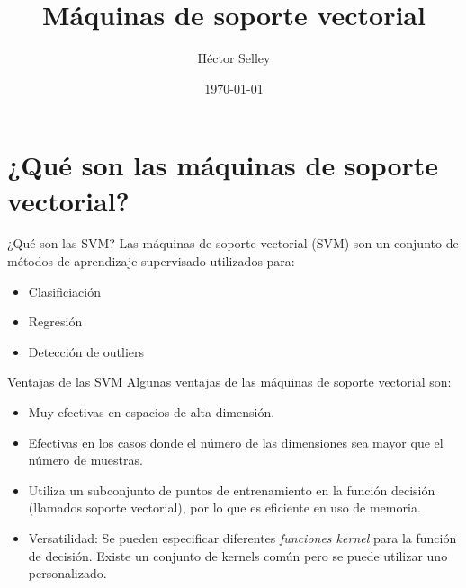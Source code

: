 \documentclass[11pt,aspectratio=169]{beamer}
\author{Héctor Selley}
\title{Máquinas de soporte vectorial}
\institute{Universidad Anáhuac México}
\date{\today}
\begin{document}

\begin{frame}
	\titlepage
\end{frame}


\section{¿Qué son las máquinas de soporte vectorial?}
\begin{frame}{¿Qué son las SVM?}
  Las máquinas de soporte vectorial (SVM) son un conjunto de métodos de aprendizaje supervisado utilizados para: \pause
	\begin{itemize}\pause
		\item Clasificiación \pause
		\item Regresión\pause
		\item Detección de outliers
	\end{itemize}
\end{frame}

\begin{frame}{Ventajas de las SVM}
  Algunas ventajas de las máquinas de soporte vectorial son:\pause
  \begin{itemize}
    \item Muy efectivas en espacios de alta dimensión. \pause
    \item Efectivas en los casos donde el número de las dimensiones sea mayor que el número de muestras. \pause 
    \item Utiliza un subconjunto de puntos de entrenamiento en la función decisión (llamados soporte vectorial), 
      por lo que es eficiente en uso de memoria. \pause
    \item Versatilidad: Se pueden especificar diferentes \textit{funciones kernel} para la función de decisión. 
      Existe un conjunto de kernels común pero se puede utilizar uno personalizado.
  \end{itemize}
\end{frame}
\end{document}
